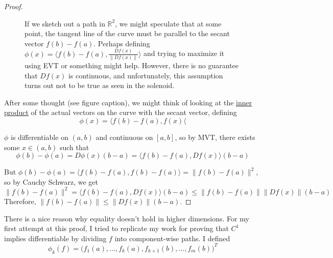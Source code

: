 \begin{proof}
\begin{figure}[H]
\begin{subfigure}[b]{0.45\textwidth}
{%
				}
				\caption{}
			\end{subfigure}
			\caption{If we sketch out a path in $\mathbb{R}^2$, we might speculate that at some point, the tangent line of the curve must be parallel to the secant vector $f(b) - f(a)$. Perhaps defining $\phi(x) = \langle f(b) - f(a), \frac{Df(x)}{\|Df(x)\|} \rangle$ and trying to maximize it using EVT or something might help. However, there is no guarantee that $Df(x)$ is continuous, and unfortunately, this assumption turns out not to be true as seen in the solenoid.}
			\label{fig:mvt_path}
		\end{figure}

		After some thought (see figure caption), we might think of looking at the \hyperref[lin-def:inner-product]{inner product} of the actual vectors on the curve with the secant vector, defining 
		\begin{equation}
			\phi(x) = \langle f(b) - f(a), f(x) \langle
		\end{equation} 

		$\phi$ is differentiable on $(a, b)$ and continuous on $[a, b]$, so by MVT, there exists some $x \in (a, b)$ such that
		\begin{equation}
		  \phi(b) - \phi(a) = D\phi(x) (b - a) = \langle f(b) - f(a), Df(x) \rangle (b - a) 
		\end{equation}

		But $\phi(b) - \phi(a) = \langle f(b) - f(a), f(b) - f(a) \rangle = \|f(b) - f(a)\|^2$, so by Cauchy Schwarz, we get 
		\begin{equation}
		  \|f(b) - f(a)\|^2 = \langle f(b) - f(a), Df(x) \rangle (b - a) \leq \|f(b) - f(a)\| \|Df(x)\| (b - a) 
		\end{equation}
		Therefore, $\|f(b) - f(a)\| \leq \|Df(x)\| (b - a)$. 
	\end{proof}

	There is a nice reason why equality doesn't hold in higher dimensions. For my first attempt at this proof, I tried to replicate my work for proving that $C^1$ implies differentiable by dividing $f$ into component-wise paths. I defined 
	\begin{equation}
		\phi_k (f) = \big(f_1 (a), \ldots, f_k(a), f_{k+1}(b), \ldots, f_m (b) \big)^T
	\end{equation}

